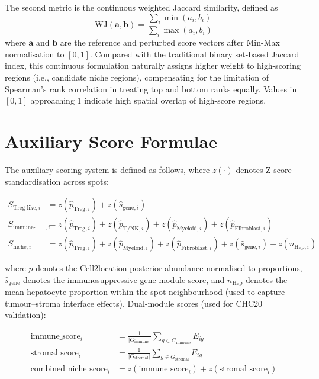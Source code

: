 \documentclass[12pt, a4paper]{article}
\begin{document}
The second metric is the continuous weighted Jaccard similarity, defined as
\begin{equation}
\text{WJ}(\mathbf{a}, \mathbf{b}) = \frac{\sum_i \min(a_i, b_i)}{\sum_i \max(a_i, b_i)}
\label{eq:weighted_jaccard}
\end{equation}
where $\mathbf{a}$ and $\mathbf{b}$ are the reference and perturbed score vectors after Min-Max normalisation to $[0,1]$. Compared with the traditional binary set-based Jaccard index, this continuous formulation naturally assigns higher weight to high-scoring regions (i.e., candidate niche regions), compensating for the limitation of Spearman's rank correlation in treating top and bottom ranks equally. Values in $[0, 1]$ approaching 1 indicate high spatial overlap of high-score regions.

\section{Auxiliary Score Formulae}
\label{app:scores}

The auxiliary scoring system is defined as follows, where $z(\cdot)$ denotes Z-score standardisation across spots:

\begin{align}
S_{\text{Treg-like},i} &= z(\hat{p}_{\text{Treg},i}) + z(\hat{s}_{\text{gene},i}) \\
S_{\text{immune-stroma},i} &= z(\hat{p}_{\text{Treg},i}) + z(\hat{p}_{\text{T/NK},i}) + z(\hat{p}_{\text{Myeloid},i}) + z(\hat{p}_{\text{Fibroblast},i}) \\
S_{\text{niche},i} &= z(\hat{p}_{\text{Treg},i}) + z(\hat{p}_{\text{Myeloid},i}) + z(\hat{p}_{\text{Fibroblast},i}) + z(\hat{s}_{\text{gene},i}) + z(\bar{n}_{\text{Hep},i})
\end{align}

where $\hat{p}$ denotes the Cell2location posterior abundance normalised to proportions, $\hat{s}_{\text{gene}}$ denotes the immunosuppressive gene module score, and $\bar{n}_{\text{Hep}}$ denotes the mean hepatocyte proportion within the spot neighbourhood (used to capture tumour--stroma interface effects). Dual-module scores (used for CHC20 validation):

\begin{align}
\text{immune\_score}_i &= \frac{1}{|G_{\text{immune}}|}\sum_{g \in G_{\text{immune}}} E_{ig} \\
\text{stromal\_score}_i &= \frac{1}{|G_{\text{stromal}}|}\sum_{g \in G_{\text{stromal}}} E_{ig} \\
\text{combined\_niche\_score}_i &= z(\text{immune\_score}_i) + z(\text{stromal\_score}_i)
\end{align}
\end{document}
